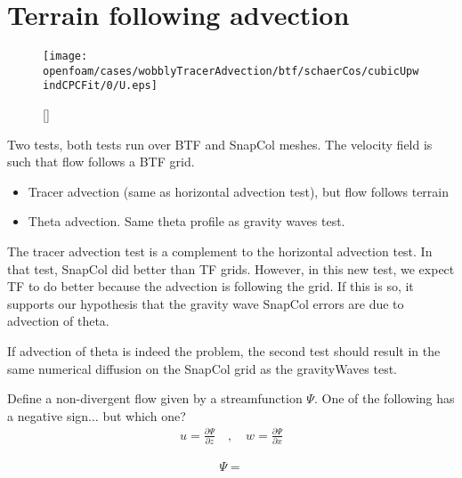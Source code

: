 \section{Terrain following advection}

\begin{figure}
	\centering
	\texttt{[image: openfoam/cases/wobblyTracerAdvection/btf/schaerCos/cubicUpwindCPCFit/0/U.eps]}
	\caption{}
	\label{fig:wobblyTracer:u}
\end{figure}

\begin{figure}
	\captionsetup[subfigure]{position=b}
	\centering
	[\textwidth]{}
\end{figure}

Two tests, both tests run over BTF and SnapCol meshes.  The velocity field is such that flow follows a BTF grid.
\begin{itemize}
\item Tracer advection (same as horizontal advection test), but flow follows terrain
\item Theta advection.  Same theta profile as gravity waves test.  
\end{itemize}

The tracer advection test is a complement to the horizontal advection test.  In that test, SnapCol did better than TF grids.  However, in this new test, we expect TF to do better because the advection is following the grid.  If this is so, it supports our hypothesis that the gravity wave SnapCol errors are due to advection of theta.

If advection of theta is indeed the problem, the second test should result in the same numerical diffusion on the SnapCol grid as the gravityWaves test.

Define a non-divergent flow given by a streamfunction $\Psi$.  One of the following has a negative sign... but which one?
\begin{align}
u = \frac{\partial \Psi}{\partial z} \quad,\quad w = \frac{\partial \Psi}{\partial x}
\end{align}

\begin{align}
\Psi = 
\end{align}
